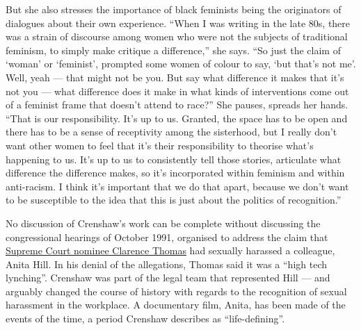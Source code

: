 \documentclass{article}
\begin{document}
But she also stresses the importance of black feminists being the originators
of dialogues about their own experience. ``When I was writing in the late 80s,
there was a strain of discourse among women who were not the subjects of
traditional feminism, to simply make critique a difference,'' she says. ``So
just the claim of `woman' or `feminist', prompted some women of colour to say,
`but that's not me'. Well, yeah --- that might not be you. But say what
difference it makes that it's not you --- what difference does it make in what
kinds of interventions come out of a feminist frame that doesn't attend to
race?'' She pauses, spreads her hands. ``That is our responsibility. It's up to
us. Granted, the space has to be open and there has to be a sense of
receptivity among the sisterhood, but I really don't want other women to feel
that it's their responsibility to theorise what's happening to us. It's up to
us to consistently tell those stories, articulate what difference the
difference makes, so it's incorporated within feminism and within anti-racism.
I think it's important that we do that apart, because we don't want to be
susceptible to the idea that this is just about the politics of recognition.''

No discussion of Crenshaw's work can be complete without discussing the
congressional hearings of October 1991, organised to address the claim that
\href{http://en.wikipedia.org/wiki/Clarence_Thomas}{Supreme Court nominee
	Clarence Thomas} had sexually harassed a colleague, Anita Hill. In his
denial of the allegations, Thomas said it was a ``high tech lynching''.
Crenshaw was part of the legal team that represented Hill --- and arguably
changed the course of history with regards to the recognition of sexual
harassment in the workplace. A documentary film, Anita, has been made of the
events of the time, a period Crenshaw describes as ``life-defining''.
\end{document}
